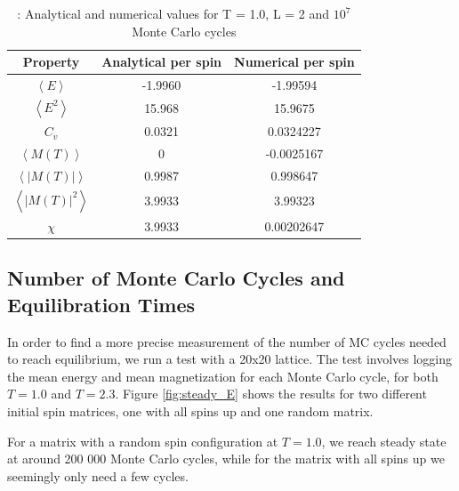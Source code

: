 \documentclass{article}
\begin{document}
	{\renewcommand{\arraystretch}{1.5}
	\begin{table}[h!]
		\caption{: Analytical and numerical values for T = 1.0, L = 2 and $10^7$ Monte Carlo cycles }
			\label{Tab: values}
			\centering
		\begin{tabular}{c c c}
			Property & Analytical per spin & Numerical per spin \\
			\hline
			$\left<E\right>$ & -1.9960 & -1.99594\\
			$\left<E^2\right>$ & 15.968 &15.9675 \\
			$C_v$ & 0.0321 & 0.0324227 \\
			$\left<M(T)\right>$   & 0 & -0.0025167\\
			$\left<|M(T)|\right>$ & 0.9987 & 0.998647 \\
			$\left<|M(T)|^2\right> $  & 3.9933 & 3.99323\\
			$\chi$ & 3.9933 & 0.00202647\\
		\end{tabular}
	\end{table}

	\subsection{Number of Monte Carlo Cycles and Equilibration Times}
		In order to find a more precise measurement of the number of MC cycles needed to reach equilibrium, we run a test with a 20x20 lattice. The test involves logging the mean energy and mean magnetization for each Monte Carlo cycle, for both $T=1.0$ and $T=2.3$. Figure \ref{fig:steady_E} shows the results for two different initial spin matrices, one with all spins up and one random matrix.

		For a matrix with a random spin configuration at $T=1.0$, we reach steady state at around 200 000 Monte Carlo cycles, while for the matrix with all spins up we seemingly only need a few cycles.

}
\end{document}
